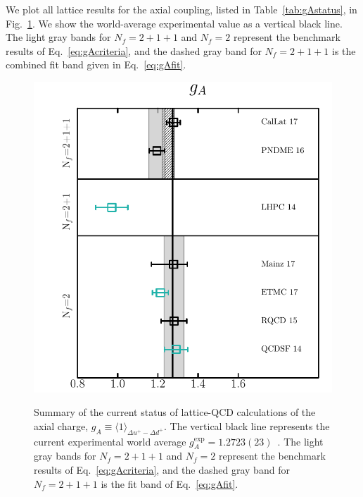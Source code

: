 We plot all lattice results for the axial coupling, listed in 
Table~\ref{tab:gAstatus}, in Fig.~\ref{fig:gaLQCDstatus}. 
%
We show the world-average experimental value as a vertical black line. 
%
The light gray bands for $N_f=2+1+1$ and $N_f=2$ represent the benchmark 
results of Eq.~\eqref{eq:gAcriteria}, and the dashed gray band for
$N_f=2+1+1$ is the combined fit band given in Eq.~\eqref{eq:gAfit}. 

\begin{figure}[!t]
\centering
\includegraphics[scale=0.7]{plots/ga_summary.pdf}\\
\caption{\small Summary of the current status of lattice-QCD calculations of 
the axial charge, $g_A\equiv \langle 1\rangle_{\Delta u^+-\Delta d^+}$.
%
The vertical black line represents the current experimental world average 
$g_A^{\mathrm{exp}} = 1.2723(23)$~\cite{Olive:2016xmw}. 
%
The light gray bands for $N_f=2+1+1$ and $N_f=2$ represent the benchmark 
results of Eq.~\eqref{eq:gAcriteria}, and the dashed gray band for
$N_f=2+1+1$ is the fit band of Eq.~\eqref{eq:gAfit}.}    
\label{fig:gaLQCDstatus}
\end{figure}

